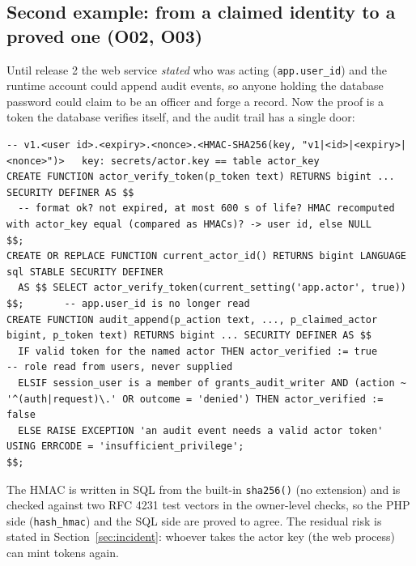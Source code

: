 \documentclass[10pt,a4paper]{article}
\newcommand{\code}[1]{\nolinkurl{#1}}
\begin{document}
\subsection{Second example: from a claimed identity to a proved one (O02, O03)}
Until release 2 the web service \emph{stated} who was acting (\code{app.user_id}) and the runtime account could append audit events, so anyone holding the database password could claim to be an officer and forge a record. Now the proof is a token the database verifies itself, and the audit trail has a single door:
\begin{lstlisting}[language=SQLx,caption={database/06\_identity\_and\_audit.sql (condensed)}]
-- v1.<user id>.<expiry>.<nonce>.<HMAC-SHA256(key, "v1|<id>|<expiry>|<nonce>")>   key: secrets/actor.key == table actor_key
CREATE FUNCTION actor_verify_token(p_token text) RETURNS bigint ... SECURITY DEFINER AS $$
  -- format ok? not expired, at most 600 s of life? HMAC recomputed with actor_key equal (compared as HMACs)? -> user id, else NULL
$$;
CREATE OR REPLACE FUNCTION current_actor_id() RETURNS bigint LANGUAGE sql STABLE SECURITY DEFINER
  AS $$ SELECT actor_verify_token(current_setting('app.actor', true)) $$;       -- app.user_id is no longer read
CREATE FUNCTION audit_append(p_action text, ..., p_claimed_actor bigint, p_token text) RETURNS bigint ... SECURITY DEFINER AS $$
  IF valid token for the named actor THEN actor_verified := true            -- role read from users, never supplied
  ELSIF session_user is a member of grants_audit_writer AND (action ~ '^(auth|request)\.' OR outcome = 'denied') THEN actor_verified := false
  ELSE RAISE EXCEPTION 'an audit event needs a valid actor token' USING ERRCODE = 'insufficient_privilege';
$$;
\end{lstlisting}
The HMAC is written in SQL from the built-in \code{sha256()} (no extension) and is checked against two RFC 4231 test vectors in the owner-level checks, so the PHP side (\code{hash\_hmac}) and the SQL side are proved to agree. The residual risk is stated in Section~\ref{sec:incident}: whoever takes the actor key (the web process) can mint tokens again.
\end{document}
